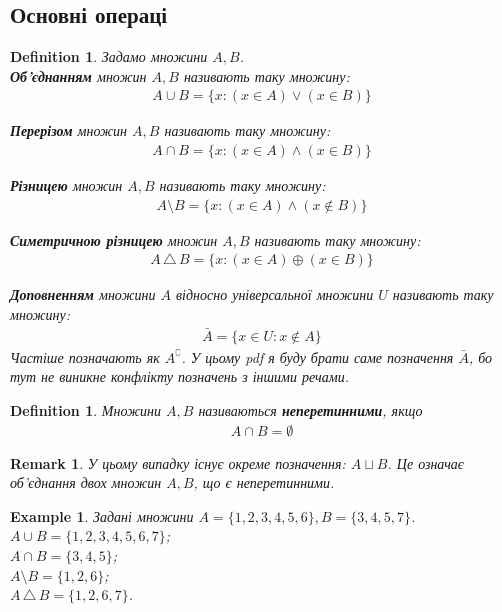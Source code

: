 \documentclass[a4paper, 14pt]{extarticle}
\theoremstyle{theoremdd}
\theoremstyle{theoremdd}
\newtheorem{definition}[theorem]{Definition}
\theoremstyle{theoremdd}
\theoremstyle{theoremdd}
\theoremstyle{theoremdd}
\newtheorem{example}[theorem]{Example}
\theoremstyle{theoremdd}
\theoremstyle{theoremdd}
\theoremstyle{theoremdd}
\theoremstyle{theoremdd}
\theoremstyle{theoremdd}
\theoremstyle{theoremdd}
\newtheorem{remark}[theorem]{Remark}
\theoremstyle{theoremdd}
\theoremstyle{theoremdd}
\theoremstyle{theoremdd}
\theoremstyle{theoremdd}
\newcommand{\symdif}{\,\triangle\,} %
\begin{document}
\subsection{Основні операці}
\begin{definition}
Задамо множини $A,B$.\\
\textbf{Об'єднанням} множин $A,B$ називають таку множину:
\begin{align*}
A \cup B = \{x: (x \in  A) \vee (x \in B) \}
\end{align*}

\textbf{Перерізом} множин $A,B$ називають таку множину:
\begin{align*}
A \cap B = \{x: (x \in  A) \wedge (x \in B) \}
\end{align*}

\textbf{Різницею} множин $A,B$ називають таку множину:
\begin{align*}
A \setminus B = \{x: (x \in A) \wedge (x \not\in B)\}
\end{align*}

\textbf{Симетричною різницею} множин $A,B$ називають таку множину:
\begin{align*}
A \symdif B = \{x: (x \in A) \oplus (x \in B)\}
\end{align*}

\textbf{Доповненням} множини $A$ відносно універсальної множини $U$ називають таку множину:
\begin{align*}
\bar{A} = \{x \in U: x \not\in A\}
\end{align*}
Частіше позначають як $A^\complement$. У цьому pdf я буду брати саме позначення $\bar{A}$, бо тут не виникне конфлікту позначень з іншими речами.
\end{definition}

\begin{definition}
Множини $A,B$ називаються \textbf{неперетинними}, якщо 
\begin{align*}
A \cap B = \emptyset
\end{align*}
\end{definition}

\begin{remark}
У цьому випадку існує окреме позначення: $A \sqcup B$. Це означає об'єднання двох множин $A,B$, що є неперетинними.
\end{remark}

\begin{example}
Задані множини $A = \{1,2,3,4,5,6\}, B = \{3,4,5,7\}$.\\
$A \cup B = \{1,2,3,4,5,6,7\}$;\\
$A \cap B = \{3,4,5\}$;\\
$A \setminus B = \{1,2,6\}$;\\
$A \symdif B = \{1,2,6,7\}$.
\end{example}
\end{document}
